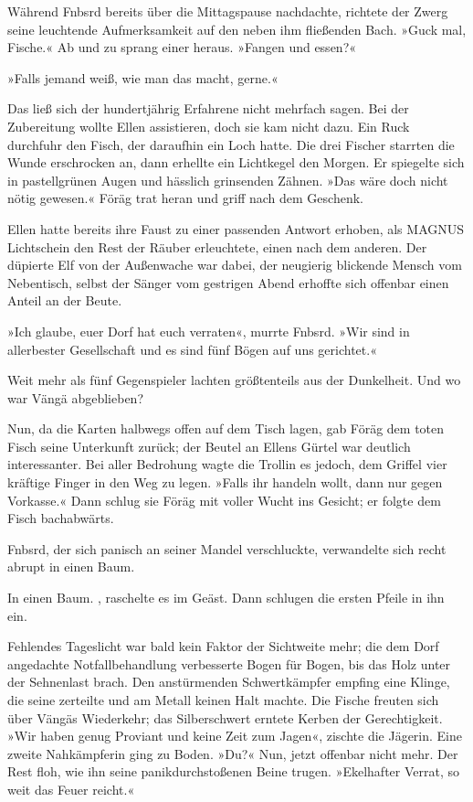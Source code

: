 Während Fnbsrd bereits über die Mittagspause nachdachte, richtete der Zwerg seine leuchtende Aufmerksamkeit auf den neben ihm fließenden Bach. »Guck mal, Fische.« Ab und zu sprang einer heraus. »Fangen und essen?«

»Falls jemand weiß, wie man das macht, gerne.«

Das ließ sich der hundertjährig Erfahrene nicht mehrfach sagen. Bei der Zubereitung wollte Ellen assistieren, doch sie kam nicht dazu. Ein Ruck durchfuhr den Fisch, der daraufhin ein Loch hatte. Die drei Fischer starrten die Wunde erschrocken an, dann erhellte ein Lichtkegel den Morgen. Er spiegelte sich in pastellgrünen Augen und hässlich grinsenden Zähnen. »Das wäre doch nicht nötig gewesen.« Föräg trat heran und griff nach dem Geschenk.

Ellen hatte bereits ihre Faust zu einer passenden Antwort erhoben, als MAGNUS Lichtschein den Rest der Räuber erleuchtete, einen nach dem anderen. Der düpierte Elf von der Außenwache war dabei, der neugierig blickende Mensch vom Nebentisch, selbst der Sänger vom gestrigen Abend erhoffte sich offenbar einen Anteil an der Beute.

»Ich glaube, euer Dorf hat euch verraten«, murrte Fnbsrd. »Wir sind in allerbester Gesellschaft und es sind fünf Bögen auf uns gerichtet.«

Weit mehr als fünf Gegenspieler lachten größtenteils aus der Dunkelheit. Und wo war Vängä abgeblieben?

Nun, da die Karten halbwegs offen auf dem Tisch lagen, gab Föräg dem toten Fisch seine Unterkunft zurück; der Beutel an Ellens Gürtel war deutlich interessanter. Bei aller Bedrohung wagte die Trollin es jedoch, dem Griffel vier kräftige Finger in den Weg zu legen. »Falls ihr handeln wollt, dann nur gegen Vorkasse.« Dann schlug sie Föräg mit voller Wucht ins Gesicht; er folgte dem Fisch bachabwärts.

Fnbsrd, der sich panisch an seiner Mandel verschluckte, verwandelte sich recht abrupt in einen Baum.

In einen Baum. , raschelte es im Geäst.  Dann schlugen die ersten Pfeile in ihn ein.

Fehlendes Tageslicht war bald kein Faktor der Sichtweite mehr; die dem Dorf angedachte Notfallbehandlung verbesserte Bogen für Bogen, bis das Holz unter der Sehnenlast brach. Den anstürmenden Schwertkämpfer empfing eine Klinge, die seine zerteilte und am Metall keinen Halt machte. Die Fische freuten sich über Vängäs Wiederkehr; das Silberschwert erntete Kerben der Gerechtigkeit. »Wir haben genug Proviant und keine Zeit zum Jagen«, zischte die Jägerin. Eine zweite Nahkämpferin ging zu Boden. »Du?« Nun, jetzt offenbar nicht mehr. Der Rest floh, wie ihn seine panikdurchstoßenen Beine trugen. »Ekelhafter Verrat, so weit das Feuer reicht.«

